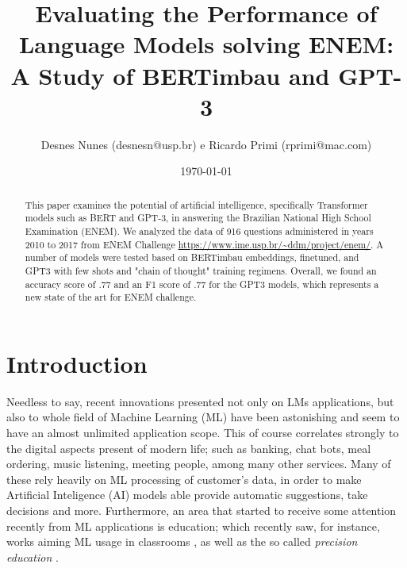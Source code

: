 \documentclass{article}
\title{Evaluating the Performance of Language Models solving ENEM: A Study of BERTimbau and GPT-3 }
\author{Desnes Nunes (desnesn@usp.br) e Ricardo Primi (rprimi@mac.com)}
\date{\today}
\begin{document}
\maketitle

\begin{abstract}

This paper examines the potential of artificial intelligence, specifically Transformer models such as BERT and GPT-3, in answering the Brazilian National High School Examination (ENEM). We analyzed the data of 916 questions administered in years 2010 to 2017 from ENEM Challenge \url{https://www.ime.usp.br/~ddm/project/enem/}. A number of models were tested based on BERTimbau embeddings, finetuned, and GPT3 with few shots and "chain of thought" training regimens. Overall, we found an accuracy score of .77 and an F1 score of .77 for the GPT3 models, which represents a new state of the art for ENEM challenge.



\end{abstract}

\section{Introduction}

Needless to say, recent innovations presented not only on LMs applications, but also to whole field of Machine Learning (ML) have been astonishing and seem to have an  almost unlimited application scope. This of course correlates strongly to the digital aspects present of modern life; such as banking, chat bots, meal ordering, music listening, meeting people, among many other services. Many of these rely heavily on ML processing of customer's data, in order to make Artificial Inteligence (AI) models able provide automatic suggestions, take decisions and more. Furthermore, an area that started to receive some attention recently from ML applications is education; which recently saw, for instance, works aiming ML usage in classrooms \cite{kuvcak2018machine}, as well as the so called \textit{precision education} \cite{luan2021review}. 
\end{document}
